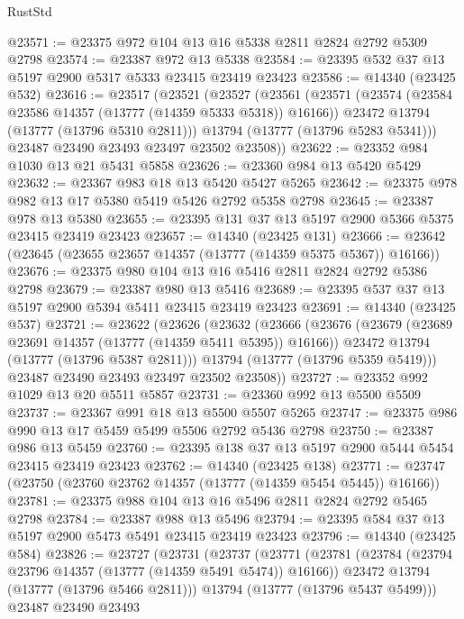 \begin{lexlean}{RustStd}
\begin{coremodule}
@23571 := @23375 @972 @104 @13 @16 @5338 @2811 @2824 @2792 @5309 @2798
@23574 := @23387 @972 @13 @5338
@23584 := @23395 @532 @37 @13 @5197 @2900 @5317 @5333 @23415 @23419 @23423
@23586 := @14340 (@23425 @532)
@23616 := @23517
    (@23521
      (@23527
        (@23561
          (@23571
            (@23574 (@23584 @23586 @14357 (@13777 (@14359 @5333 @5318)) @16166))
            @23472
            @13794
            (@13777 (@13796 @5310 @2811)))
          @13794
          (@13777 (@13796 @5283 @5341)))
        @23487
        @23490
        @23493
        @23497
        @23502
        @23508))
@23622 := @23352 @984 @1030 @13 @21 @5431 @5858
@23626 := @23360 @984 @13 @5420 @5429
@23632 := @23367 @983 @18 @13 @5420 @5427 @5265
@23642 := @23375 @978 @982 @13 @17 @5380 @5419 @5426 @2792 @5358 @2798
@23645 := @23387 @978 @13 @5380
@23655 := @23395 @131 @37 @13 @5197 @2900 @5366 @5375 @23415 @23419 @23423
@23657 := @14340 (@23425 @131)
@23666 := @23642 (@23645 (@23655 @23657 @14357 (@13777 (@14359 @5375 @5367)) @16166))
@23676 := @23375 @980 @104 @13 @16 @5416 @2811 @2824 @2792 @5386 @2798
@23679 := @23387 @980 @13 @5416
@23689 := @23395 @537 @37 @13 @5197 @2900 @5394 @5411 @23415 @23419 @23423
@23691 := @14340 (@23425 @537)
@23721 := @23622
    (@23626
      (@23632
        (@23666
          (@23676
            (@23679 (@23689 @23691 @14357 (@13777 (@14359 @5411 @5395)) @16166))
            @23472
            @13794
            (@13777 (@13796 @5387 @2811)))
          @13794
          (@13777 (@13796 @5359 @5419)))
        @23487
        @23490
        @23493
        @23497
        @23502
        @23508))
@23727 := @23352 @992 @1029 @13 @20 @5511 @5857
@23731 := @23360 @992 @13 @5500 @5509
@23737 := @23367 @991 @18 @13 @5500 @5507 @5265
@23747 := @23375 @986 @990 @13 @17 @5459 @5499 @5506 @2792 @5436 @2798
@23750 := @23387 @986 @13 @5459
@23760 := @23395 @138 @37 @13 @5197 @2900 @5444 @5454 @23415 @23419 @23423
@23762 := @14340 (@23425 @138)
@23771 := @23747 (@23750 (@23760 @23762 @14357 (@13777 (@14359 @5454 @5445)) @16166))
@23781 := @23375 @988 @104 @13 @16 @5496 @2811 @2824 @2792 @5465 @2798
@23784 := @23387 @988 @13 @5496
@23794 := @23395 @584 @37 @13 @5197 @2900 @5473 @5491 @23415 @23419 @23423
@23796 := @14340 (@23425 @584)
@23826 := @23727
    (@23731
      (@23737
        (@23771
          (@23781
            (@23784 (@23794 @23796 @14357 (@13777 (@14359 @5491 @5474)) @16166))
            @23472
            @13794
            (@13777 (@13796 @5466 @2811)))
          @13794
          (@13777 (@13796 @5437 @5499)))
        @23487
        @23490
        @23493

\end{coremodule}
\end{lexlean}

